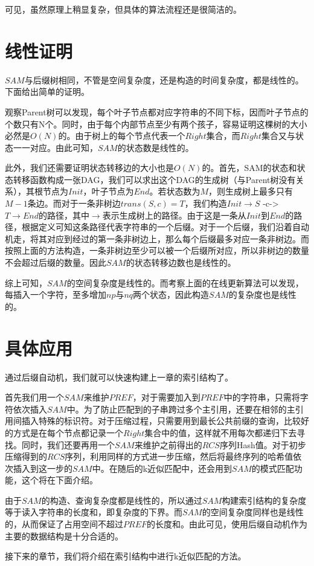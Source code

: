 ﻿\documentclass{sysuthesis}
\begin{document}
可见，虽然原理上稍显复杂，但具体的算法流程还是很简洁的。



\section{线性证明}
$SAM$与后缀树相同，不管是空间复杂度，还是构造的时间复杂度，都是线性的。下面给出简单的证明。\par
观察Parent树可以发现，每个叶子节点都对应字符串的不同下标，因而叶子节点的个数只有N个。同时，由于每个内部节点至少有两个孩子，容易证明这棵树的大小必然是$O(N)$的。由于树上的每个节点代表一个$Right$集合，而$Right$集合又与状态一一对应。由此可知，$SAM$的状态数是线性的。\par
此外，我们还需要证明状态转移边的大小也是$O(N)$的。首先，SAM的状态和状态转移函数构成一张DAG，我们可以求出这个DAG的生成树（与Parent树没有关系），其根节点为$Init$，叶子节点为$End$。若状态数为$M$，则生成树上最多只有$M - 1$条边。而对于一条非树边$trans(S, c) = T$，我们构造$Init \rightarrow S$ -c-> $T \rightarrow End$的路径，其中$\rightarrow$表示生成树上的路径。由于这是一条从$Init$到$End$的路径，根据定义可知这条路径代表字符串的一个后缀。对于一个后缀，我们沿着自动机走，将其对应到经过的第一条非树边上，那么每个后缀最多对应一条非树边。而按照上面的方法构造，一条非树边至少可以被一个后缀所对应，所以非树边的数量不会超过后缀的数量。因此$SAM$的状态转移边数也是线性的。\par
综上可知，$SAM$的空间复杂度是线性的。而考察上面的在线更新算法可以发现，每插入一个字符，至多增加$np$与$nq$两个状态，因此构造$SAM$的复杂度也是线性的。


\section{具体应用}
通过后缀自动机，我们就可以快速构建上一章的索引结构了。\par
首先我们用一个$SAM$来维护$PREF$，对于需要加入到$PREF$中的字符串，只需将字符依次插入$SAM$中。为了防止匹配到的子串跨过多个主引用，还要在相邻的主引用间插入特殊的标识符。对于压缩过程，只需要用到最长公共前缀的查询，比较好的方式是在每个节点都记录一个$Right$集合中的值，这样就不用每次都递归下去寻找。同时，我们还要再用一个$SAM$来维护之前得出的$RCS$序列Hash值。对于初步压缩得到的$RCS$序列，利用同样的方式进一步压缩，然后将最终序列的哈希值依次插入到这一步的$SAM$中。在随后的k近似匹配中，还会用到$SAM$的模式匹配功能，这个将在下面介绍。\par
由于$SAM$的构造、查询复杂度都是线性的，所以通过$SAM$构建索引结构的复杂度等于读入字符串的长度和，即复杂度的下界。而$SAM$的空间复杂度同样也是线性的，从而保证了占用空间不超过$PREF$的长度和。由此可见，使用后缀自动机作为主要的数据结构是十分合适的。\par
接下来的章节，我们将介绍在索引结构中进行k近似匹配的方法。
\end{document}

